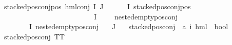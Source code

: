 \begin{isabellebody}
{\isachardoublequoteopen}stacked{\isacharunderscore}{\kern0pt}pos{\isacharunderscore}{\kern0pt}conj{\isacharunderscore}{\kern0pt}pos\ {\isacharparenleft}{\kern0pt}hml{\isacharunderscore}{\kern0pt}conj\ I\ J\ {\isasymPhi}{\isacharparenright}{\kern0pt}{\isachardoublequoteclose}\isanewline
{}\ {\isachardoublequoteopen}{\isacharparenleft}{\kern0pt}{\isacharparenleft}{\kern0pt}{\isasymexists}{\isasymphi}\ {\isasymin}\ {\isacharparenleft}{\kern0pt}{\isasymPhi}\ {\isacharbackquote}{\kern0pt}\ I{\isacharparenright}{\kern0pt}{\isachardot}{\kern0pt}\ {\isacharparenleft}{\kern0pt}{\isacharparenleft}{\kern0pt}stacked{\isacharunderscore}{\kern0pt}pos{\isacharunderscore}{\kern0pt}conj{\isacharunderscore}{\kern0pt}pos\ {\isasymphi}{\isacharparenright}{\kern0pt}\ {\isasymand}\ \isanewline
\ \ \ \ \ \ \ \ \ \ \ \ \ \ \ \ \ \ \ \ \ {\isacharparenleft}{\kern0pt}{\isasymforall}{\isasympsi}\ {\isasymin}\ {\isacharparenleft}{\kern0pt}{\isasymPhi}\ {\isacharbackquote}{\kern0pt}\ I{\isacharparenright}{\kern0pt}{\isachardot}{\kern0pt}\ {\isasympsi}\ {\isasymnoteq}\ {\isasymphi}\ {\isasymlongrightarrow}\ nested{\isacharunderscore}{\kern0pt}empty{\isacharunderscore}{\kern0pt}pos{\isacharunderscore}{\kern0pt}conj\ {\isasympsi}{\isacharparenright}{\kern0pt}{\isacharparenright}{\kern0pt}{\isacharparenright}{\kern0pt}\ {\isasymor}\isanewline
\ \ \ {\isacharparenleft}{\kern0pt}{\isasymforall}{\isasympsi}\ {\isasymin}\ {\isacharparenleft}{\kern0pt}{\isasymPhi}\ {\isacharbackquote}{\kern0pt}\ I{\isacharparenright}{\kern0pt}{\isachardot}{\kern0pt}\ nested{\isacharunderscore}{\kern0pt}empty{\isacharunderscore}{\kern0pt}pos{\isacharunderscore}{\kern0pt}conj\ {\isasympsi}{\isacharparenright}{\kern0pt}{\isacharparenright}{\kern0pt}{\isachardoublequoteclose}\isanewline
{\isachardoublequoteopen}{\isacharparenleft}{\kern0pt}{\isasymPhi}\ {\isacharbackquote}{\kern0pt}\ J{\isacharparenright}{\kern0pt}\ {\isacharequal}{\kern0pt}\ {\isacharbraceleft}{\kern0pt}{\isacharbraceright}{\kern0pt}{\isachardoublequoteclose}\isanewline
\isanewline
{}\isamarkupfalse%
\ stacked{\isacharunderscore}{\kern0pt}pos{\isacharunderscore}{\kern0pt}conj\ {\isacharcolon}{\kern0pt}{\isacharcolon}{\kern0pt}\ {\isachardoublequoteopen}{\isacharparenleft}{\kern0pt}{\isacharprime}{\kern0pt}a{\isacharcomma}{\kern0pt}\ {\isacharprime}{\kern0pt}i{\isacharparenright}{\kern0pt}\ hml\ {\isasymRightarrow}\ bool{\isachardoublequoteclose}\isanewline
\ \ \ \isanewline
{\isachardoublequoteopen}stacked{\isacharunderscore}{\kern0pt}pos{\isacharunderscore}{\kern0pt}conj\ TT{\isachardoublequoteclose}\ {\isacharbar}{\kern0pt}\isanewline

\end{isabellebody}
